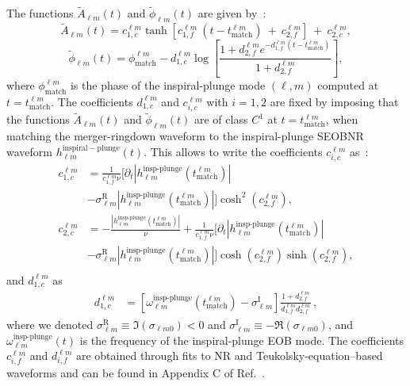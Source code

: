 \documentclass[twocolumn,prd,superscriptaddress,amsfonts,amssymb,amsmath,preprintnumbers]{revtex4-1}
\begin{document}
The functions $\tilde{A}_{\ell m}(t)$ and $\tilde{\phi}_{\ell m}(t)$ are given by~\cite{Bohe:2016gbl,Cotesta:2018fcv}:
%
\begin{equation}
\label{eq:ansatz_amp}
\tilde{A}_{\ell m}(t) = c_{1,c}^{\ell m} \tanh[c_{1,f}^{\ell m}\ (t-t_{\textrm{match}}^{\ell m}) \ +\ c_{2,f}^{\ell m}] \ + \ c_{2,c}^{\ell m},
\end{equation}
%
\begin{equation}
\label{eq:ansatz_phase}
\tilde{\phi}_{\ell m}(t) = \phi_{\textrm{match}}^{\ell m} - d_{1,c}^{\ell m} \log\left[\frac{1+d_{2,f}^{\ell m} e^{-d_{1,f}^{\ell m}(t-t_{\textrm{match}}^{\ell m})}}{1+d_{2,f}^{\ell m}}\right],
\end{equation}
%
where $ \phi_{\textrm{match}}^{\ell m}$ is the phase of the inspiral-plunge mode $(\ell, m)$ computed at $t = t_{\textrm{match}}^{\ell m}$. The coefficients $d_{1,c}^{\ell m}$ and $c_{i,c}^{\ell m}$ with $i = 1,2$
are fixed by imposing that the functions $\tilde{A}_{\ell m}(t)$ and $\tilde{\phi}_{\ell m}(t)$ are of class $C^1$ at $t = t_{\textrm{match}}^{\ell m}$, when matching the merger-ringdown waveform to the inspiral-plunge SEOBNR waveform $h_{\ell m}^\mathrm{inspiral-plunge}(t)$. This allows to write the coefficients $c_{i,c}^{\ell m}$ as~\cite{Cotesta:2018fcv}:
\begin{align} 
c_{1,c}^{\ell m} &= \frac{1}{c_{1,f}^{\ell
    m} \nu} \big[ \partial_t|h_{\ell
    m}^{\textrm{insp-plunge}}(t_{\textrm{match}}^{\ell m})| \nonumber \\
    &- \sigma^\textrm{R}_{\ell m} |h_{\ell
    m}^{\textrm{insp-plunge}}(t_{\textrm{match}}^{\ell
    m})|\big] \cosh^2{(c_{2,f}^{\ell m})}, \\
c_{2,c}^{\ell m} &= -\frac{ |h_{\ell
    m}^{\textrm{insp-plunge}}(t_{\textrm{match}}^{\ell
    m})|}{\nu} + \frac{1}{c_{1,f}^{\ell
    m} \nu} \big[ \partial_t|h_{\ell
    m}^{\textrm{insp-plunge}}(t_{\textrm{match}}^{\ell m})|  \nonumber \\
    &- \sigma^\textrm{R}_{\ell m} |h_{\ell
    m}^{\textrm{insp-plunge}}(t_{\textrm{match}}^{\ell
    m})|\big] \cosh{(c_{2,f}^{\ell m})}\sinh{(c_{2,f}^{\ell m})}, \\ \nonumber   
\end{align}
and $d_{1,c}^{\ell m}$ as
\begin{align}    
d_{1,c}^{\ell m} &= \left[\omega_{\ell m}^{\textrm{insp-plunge}}(t_{\textrm{match}}^{\ell m}) -  \sigma^\textrm{I}_{\ell
      m}\right]\frac{1+ d_{2,f}^{\ell m}}{d_{1,f}^{\ell m}d_{2,f}^{\ell m}}\,,
\end{align}
%
where we denoted $\sigma_{\ell m}^\textrm{R} \equiv \Im (\sigma_{\ell m0}) < 0$ and  $\sigma_{\ell m}^\textrm{I} \equiv -\Re (\sigma_{\ell m0})$, and $\omega_{\ell m}^{\textrm{insp-plunge}}(t)$ is the frequency of the inspiral-plunge EOB mode. The coefficients $c_{i,f}^{\ell m}$ and $d_{i,f}^{\ell m}$ are obtained through fits to NR and 
Teukolsky-equation--based waveforms and can be found in Appendix C of Ref.~\cite{Cotesta:2018fcv}.
\end{document}

